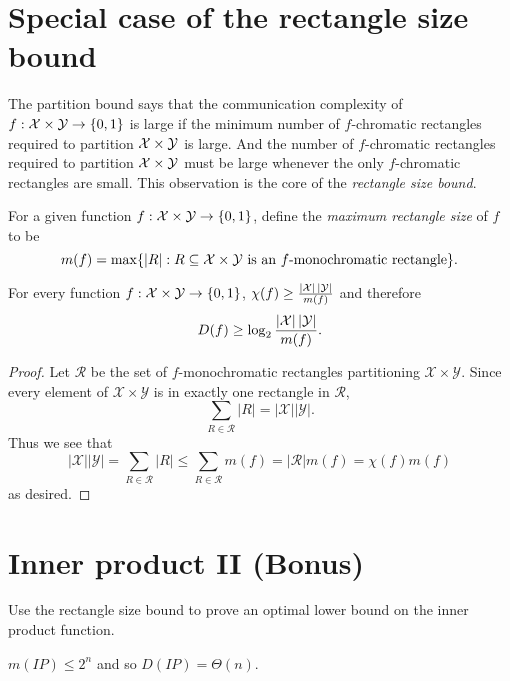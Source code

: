 \newpage \section{Special case of the rectangle size bound}

The partition bound says that the communication complexity of $f : \mathcal{X} \times \mathcal{Y} \to \{0,1\}$ is large if the minimum number of $f$-chromatic rectangles required to partition $\mathcal{X} \times \mathcal{Y}$ is large. And the number of $f$-chromatic rectangles required to partition $\mathcal{X} \times \mathcal{Y}$ must be large whenever the only $f$-chromatic rectangles are small. This observation is the core of the \emph{rectangle size bound}.

\begin{definition}[$m(f)$]
For a given function $f : \mathcal{X} \times \mathcal{Y} \to \{0,1\}$, define the \emph{maximum rectangle size} of $f$ to be
\[
m(f) = \max \{ |R| : R \subseteq \mathcal{X} \times \mathcal{Y} \mbox{ is an $f$-monochromatic rectangle} \}.
\]
\end{definition}


\begin{lemma}
For every function $f : \mathcal{X} \times \mathcal{Y} \to \{0,1\}$, $\chi(f) \ge \frac{|\mathcal{X}| \, |\mathcal{Y}|}{m(f)}$ and therefore
\[
D(f) \ge \log_2 \frac{|\mathcal{X}| \, |\mathcal{Y}|}{m(f)}.
\]
\end{lemma}

\begin{proof}
Let $\mathcal{R}$ be the set of $f$-monochromatic rectangles partitioning $\mathcal{X}\times \mathcal{Y}$. Since every element of $\mathcal{X}\times\mathcal{Y}$ is in exactly one rectangle in $\mathcal{R}$,
$$\sum_{R \in \mathcal{R}} |R| = |\mathcal{X}||\mathcal{Y}|.$$
Thus we see that
$$|\mathcal{X}||\mathcal{Y}| = \sum_{R \in \mathcal{R}} |R| \le \sum_{R \in \mathcal{R}} m(f) = |\mathcal{R}|m(f) = \chi(f)m(f)$$
as desired.
\end{proof}



\newpage \section{Inner product II (Bonus)}

Use the rectangle size bound to prove an optimal lower bound on the inner product function.

\begin{theorem}
$m(IP) \le 2^{n}$ and so $D(IP) = \Theta(n)$.
\end{theorem}

